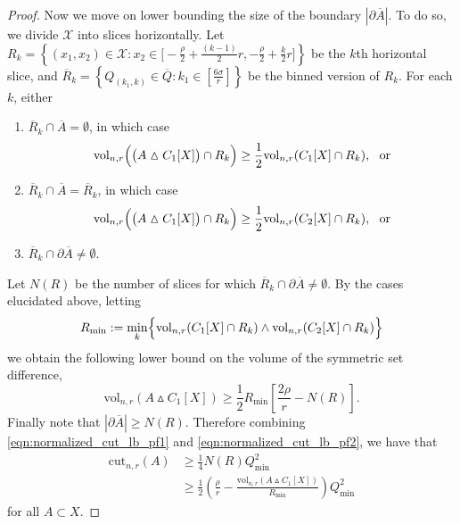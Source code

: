 \documentclass[11pt,twoside]{article}
\theoremstyle{definition}
\newcommand{\set}[1]{\left\{#1\right\}}
\newcommand{\vol}{\mathrm{vol}}
\newcommand{\cut}{\mathrm{cut}}
\newcommand{\abs}[1]{\left \lvert #1 \right \rvert}
\newcommand{\1}{\mathbbm{1}}
\newcommand{\Xbf}{X}
\begin{document}
\begin{proof}
	Now we move on lower bounding the size of the boundary $\abs{\partial\overline{A}}$. To do so, we divide $\mathcal{X}$ into slices horizontally. Let $R_k = \set{(x_1,x_2) \in \mathcal{X}: x_2 \in \bigl[-\frac{\rho}{2} + \frac{(k - 1)}{2}r, -\frac{\rho}{2} + \frac{k}{2}r\bigr]}$ be the $k$th horizontal slice, and $\overline{R}_k = \set{Q_{(k_1,k)} \in \overline{Q}:k_1 \in [\frac{6\sigma}{r}]}$ be the binned version of $R_k$. For each $k$, either
	\begin{enumerate}
		\item $\overline{R}_k \cap \overline{A} = \emptyset$, in which case
		\begin{equation*}
		\vol_{n,r}\Bigl( \bigl(A \vartriangle C_1[\Xbf]\bigr) \cap R_k \Bigr) \geq \frac{1}{2}\vol_{n,r}(C_1[\Xbf] \cap R_k), ~~ \textrm{or}
		\end{equation*}
		\item $\overline{R}_k \cap \overline{A} = \overline{R}_k$, in which case
		\begin{equation*}
		\vol_{n,r}\Bigl( \bigl(A \vartriangle C_1[\Xbf]\bigr) \cap R_k \Bigr) \geq \frac{1}{2}\vol_{n,r}(C_2[\Xbf] \cap R_k), ~~\textrm{or}
		\end{equation*}
		\item $\overline{R}_k \cap \partial \overline{A} \neq \emptyset$.
	\end{enumerate}
	Let $N(R)$ be the number of slices for which $\overline{R}_k \cap \partial \overline{A} \neq \emptyset$. By the cases elucidated above, letting
	\begin{equation*} R_{\min} := \min_{k}\Bigl\{\vol_{n,r}(C_1[\Xbf] \cap R_k) \wedge \vol_{n,r}(C_2[\Xbf] \cap R_k)\Bigr\}
	\end{equation*} 
	we obtain the following lower bound on the volume of the symmetric set difference,
	\begin{equation}
	\label{eqn:normalized_cut_lb_pf2}
	\vol_{n,r}(A \vartriangle C_1[\Xbf]) \geq \frac{1}{2} R_{\min}  \left[\frac{2\rho}{r} - N(R)\right].
	\end{equation}
	Finally note that $\abs{\partial\overline{A}} \geq N(R)$. Therefore combining \eqref{eqn:normalized_cut_lb_pf1} and \eqref{eqn:normalized_cut_lb_pf2}, we have that
	\begin{align}
	\cut_{n,r}(A) & \geq \frac{1}{4}N(R) Q_{\min}^2 \nonumber \\
	& \geq \frac{1}{2}\left(\frac{\rho}{r} - \frac{\vol_{n,r}(A \vartriangle C_1[\Xbf])}{R_{\min}}\right) Q_{\min}^2 \label{eqn:normalized_cut_lb_pf3}
	\end{align}
	for all $A \subset \Xbf$.
	

\end{proof}
\end{document}
